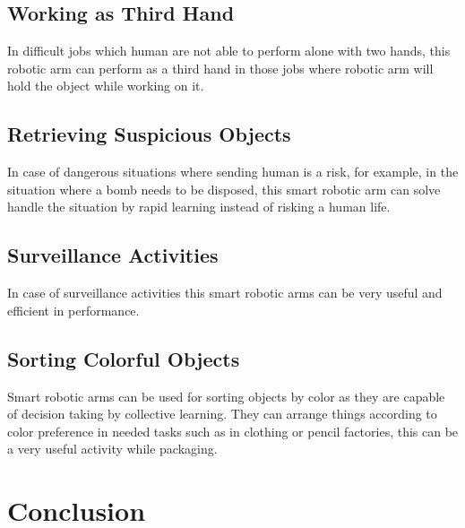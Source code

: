 \documentclass[conference]{IEEEtran}
\begin{document}
\subsection{Working as Third Hand}
In difficult jobs which human are not able to perform alone with two hands, this robotic arm can perform as a third hand in those jobs where robotic arm will hold the object while working on it.

\subsection{Retrieving Suspicious Objects}
In case of dangerous situations where sending human is a risk, for example, in the situation where a bomb needs to be disposed, this smart robotic arm can solve handle the situation by rapid learning instead of risking a human life.

\subsection{Surveillance Activities}
In case of surveillance activities this smart robotic arms can be very useful and efficient in performance.

\subsection{Sorting Colorful Objects}
Smart robotic arms can be used for sorting objects by color as they are capable of decision taking by collective learning. They can arrange things according to color preference in needed tasks such as in clothing or pencil factories, this can be a very useful activity while packaging.


\section{Conclusion}
\end{document}
